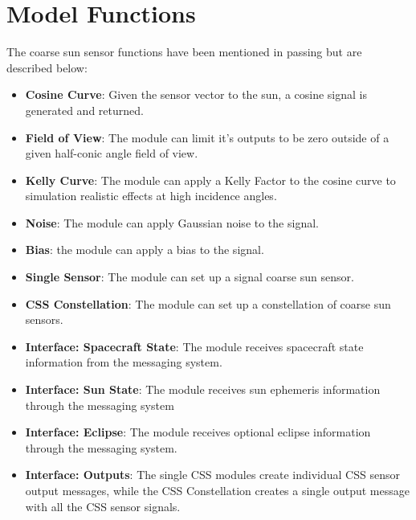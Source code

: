 
\section{Model Functions}
The coarse sun sensor functions have been mentioned in passing but are described below:
\begin{itemize}
	\item \textbf{Cosine Curve}: Given the sensor vector to the sun, a cosine signal is generated and returned.
	\item \textbf{Field of View}: The module can limit it's outputs to be zero outside of a given half-conic angle field of view.
	\item \textbf{Kelly Curve}: The module can apply a Kelly Factor to the cosine curve to simulation realistic effects at high incidence angles.
	\item \textbf{Noise}: The module can apply Gaussian noise to the signal.
	\item \textbf{Bias}: the module can apply a bias to the signal.
	\item \textbf{Single Sensor}: The module can set up a signal coarse sun sensor.
	\item \textbf{CSS Constellation}: The module can set up a constellation of coarse sun sensors.
	\item \textbf{Interface: Spacecraft State}: The module receives spacecraft state information from the messaging system.
	\item \textbf{Interface: Sun State}: The module receives sun ephemeris information through the messaging system
	\item \textbf{Interface: Eclipse}: The module receives optional eclipse information through the messaging system.
	\item \textbf{Interface: Outputs}: The single CSS modules create individual CSS sensor output messages, while the CSS Constellation creates a single output message with all the CSS sensor signals.
\end{itemize}

